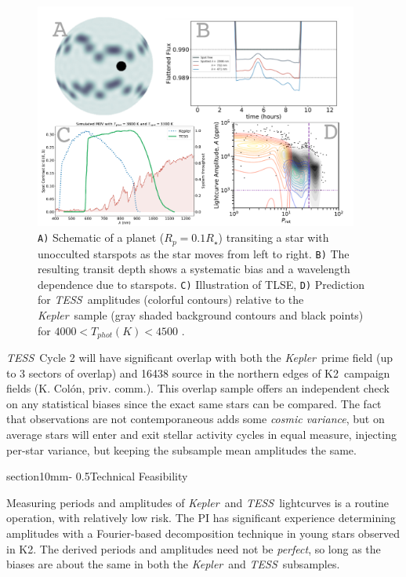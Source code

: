 \documentclass[letterpaper,11pt]{article}
\makeatletter
\renewcommand{\section}{\@startsection%
{section}{1}{0mm}{-\baselineskip}%
{0.5\baselineskip}{\normalfont\Large\bfseries}}%
\newcommand{\tess}{{\it TESS}}
\newcommand{\kepler}{{\it Kepler}}
\newcommand{\ktwo}{{K2}}
\makeatother
\begin{document}
\begin{figure}[hbt!]
\includegraphics[width=0.95\textwidth]{figures/multi_panel.pdf}
\caption{\texttt{A)} Schematic of a planet ($R_p = 0.1 R_\star$) transiting a star with unocculted starspots as the star moves from left to right.  \texttt{B)} The resulting transit depth shows a systematic bias and a wavelength dependence due to starspots. \texttt{C)} Illustration of TLSE, \texttt{D)} Prediction for \tess\ amplitudes (colorful contours) relative to the \kepler\ sample (gray shaded background contours and black points) for $4000 < T_{phot} (K) < 4500$ \citep{2014ApJS..211...24M}.}
\label{fig:predictAmps}
\end{figure}

\tess\ Cycle 2 will have significant overlap with both the \kepler\ prime field (up to 3 sectors of overlap) and 16438 source in the northern edges of \ktwo\ campaign fields (K. Col\'on, priv. comm.).  This overlap sample offers an independent check on any statistical biases since the exact same stars can be compared.  The fact that observations are not contemporaneous adds some \emph{cosmic variance}, but on average stars will enter and exit stellar activity cycles in equal measure, injecting per-star variance, but keeping the subsample mean amplitudes the same.

\section{Technical Feasibility}

Measuring periods and amplitudes of \kepler\ and \tess\ lightcurves is a routine operation, with relatively low risk.  The PI has significant experience determining amplitudes with a Fourier-based decomposition technique in young stars observed in \ktwo.  The derived periods and amplitudes need not be \emph{perfect}, so long as the biases are about the same in both the \kepler\ and \tess\ subsamples.
\end{document}
